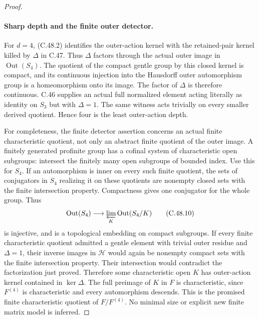 \begin{proof}
\paragraph{Sharp depth and the finite outer detector.}
For $d=4$, (C.48.2) identifies the outer-action kernel with the
retained-pair kernel killed by $\Delta$ in C.47. Thus $\Delta$
factors through the actual outer image in $\operatorname{Out}(S_4)$.
The quotient of the compact gentle group by this closed kernel is
compact, and its continuous injection into the Hausdorff outer
automorphism group is a homeomorphism onto its image. The factor
of $\Delta$ is therefore continuous.
C.46 supplies an actual full normalized element acting literally
as identity on $S_3$ but with $\Delta=1$. The same witness acts
trivially on every smaller derived quotient. Hence four is the
least outer-action depth.

For completeness, the finite detector assertion concerns an actual
finite characteristic quotient, not only an abstract finite quotient
of the outer image. A finitely generated profinite group has a
cofinal system of characteristic open subgroups: intersect the
finitely many open subgroups of bounded index. Use this for $S_4$.
If an automorphism is inner on every such finite quotient, the sets
of conjugators in $S_4$ realizing it on these quotients are nonempty
closed sets with the finite intersection property. Compactness gives
one conjugator for the whole group. Thus
\[
 \operatorname{Out}(S_4)\longrightarrow
       \varprojlim_K\operatorname{Out}(S_4/K)           \tag{C.48.10}
\]
is injective, and is a topological embedding on compact subgroups.
If every finite characteristic quotient admitted a gentle element
with trivial outer residue and $\Delta=1$, their inverse images in
$\mathcal H$ would again be nonempty compact sets with the finite
intersection property. Their intersection would contradict the
factorization just proved. Therefore some characteristic open $K$
has outer-action kernel contained in $\ker\Delta$.
The full preimage of $K$ in $F$ is characteristic, since $F^{(4)}$
is characteristic and every automorphism descends. This is the
promised finite characteristic quotient of $F/F^{(4)}$.
No minimal size or explicit new finite matrix model is inferred.
\end{proof}
